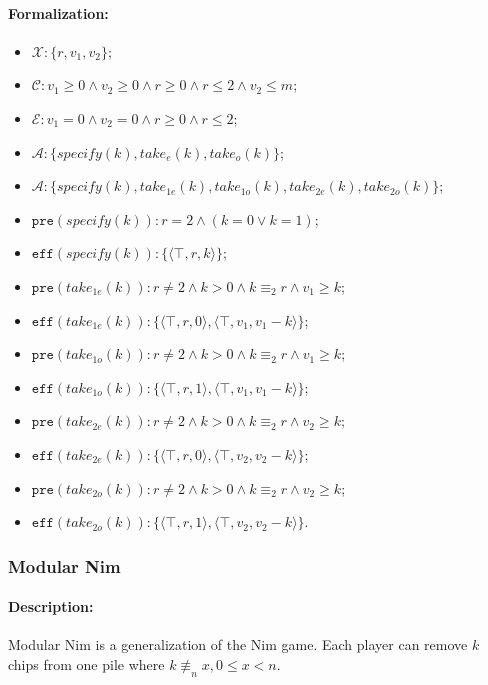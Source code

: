 \documentclass[review]{elsarticle}
\newcommand{\set}[1]{\{ #1 \}}
\newcommand{\tuple}[1]{\langle {#1} \rangle}
\newcommand{\true}{\top}
\newcommand{\statevar}{\mathcal{X}}
\newcommand{\act}{\mathcal{A}}
\newcommand{\constraint}{\mathcal{C}}
\newcommand{\estate}{\mathcal{E}}
\newcommand{\pre}{\mathtt{pre}}
\newcommand{\eff}{\mathtt{eff}}
\newcommand{\modulo}{\equiv}
\newcommand{\nmodulo}{\not \equiv}
\begin{document}
\paragraph{Formalization:}

\begin{itemize}
	\item $\statevar:\set{r, v_1, v_2} $;
	\item $\constraint: v_1 \ge 0 \wedge v_2 \ge 0 \wedge r \ge 0 \wedge  r \le 2 \wedge v_2 \le m$;
	\item $\estate: v_1 = 0 \wedge v_2 = 0 \wedge r \ge 0 \wedge  r \le 2$;
	\item $\act:\set{specify(k), take_{e}(k),  take_{o}(k)}$;
	\item {\color{red}$\act:\set{specify(k), take_{1e}(k), take_{1o}(k), take_{2e}(k), take_{2o}(k)}$;}
	\item $\pre(specify(k)): r = 2 \land (k = 0 \lor k = 1)$;
	\item $\eff(specify(k)): \set{\tuple{\true, r, k}}$;
	\item $\pre(take_{1e}(k)): r \neq 2 \wedge k > 0 \wedge  k \modulo_{2}{r} \land v_1 \ge k$;
	\item $\eff(take_{1e}(k)): \set{\tuple{\true, r, 0}, \tuple{\true, v_1, v_1-k}}$; 
	\item $\pre(take_{1o}(k)): r \neq 2 \wedge k > 0 \wedge  k \modulo_{2}{r} \wedge  v_1 \ge k$;
	\item $\eff(take_{1o}(k)): \set{\tuple{\true, r, 1}, \tuple{\true, v_1, v_1-k}}$;
	\item $\pre(take_{2e}(k)): r \neq 2 \wedge k > 0 \wedge  k \modulo_{2}{r} \land v_2 \ge k$;
	\item $\eff(take_{2e}(k)): \set{\tuple{\true, r, 0}, \tuple{\true, v_2, v_2-k}}$; 
	\item $\pre(take_{2o}(k)): r \neq 2 \wedge k > 0 \wedge  k \modulo_{2}{r} \wedge  v_2 \ge k$;
	\item $\eff(take_{2o}(k)): \set{\tuple{\true, r, 1}, \tuple{\true, v_2, v_2-k}}$.
\end{itemize}

\subsubsection{Modular Nim \protect\cite{GavS2004}}

\paragraph{Description:} 
Modular Nim is a generalization of the Nim game.
Each player can remove $k$ chips from one pile where $k \nmodulo_{n} x,0 \le x < n$.
\end{document}
